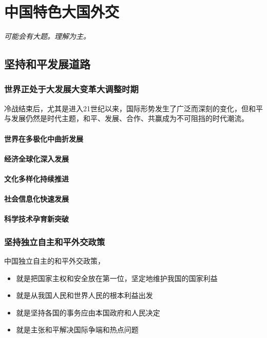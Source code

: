 \chapter{中国特色大国外交}
\emph{可能会有大题。理解为主。}

\section{坚持和平发展道路}
    \subsection{世界正处于大发展大变革大调整时期}
        冷战结束后，尤其是进入21世纪以来，国际形势发生了广泛而深刻的变化，但和平与发展仍然是时代主题，和平、发展、合作、共赢成为不可阻挡的时代潮流。

        \subsubsection{世界在多极化中曲折发展}
        \subsubsection{经济全球化深入发展}
        \subsubsection{文化多样化持续推进}
        \subsubsection{社会信息化快速发展}
        \subsubsection{科学技术孕育新突破}

    \subsection{坚持独立自主和平外交政策}
        中国独立自主的和平外交政策，
        \begin{itemize}
            \item 就是把国家主权和安全放在第一位，坚定地维护我国的国家利益
            \item 就是从我国人民和世界人民的根本利益出发
            \item 就是坚持各国的事务应由本国政府和人民决定
            \item 就是主张和平解决国际争端和热点问题
        \end{itemize}

